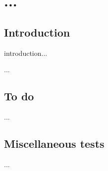 \chapter{...}
\label{sec:...}
\localtableofcontents
\section{Introduction}
introduction...

...
\begin{devMan}
\section{To do}
...
\section{Miscellaneous tests}

...
\end{devMan}
